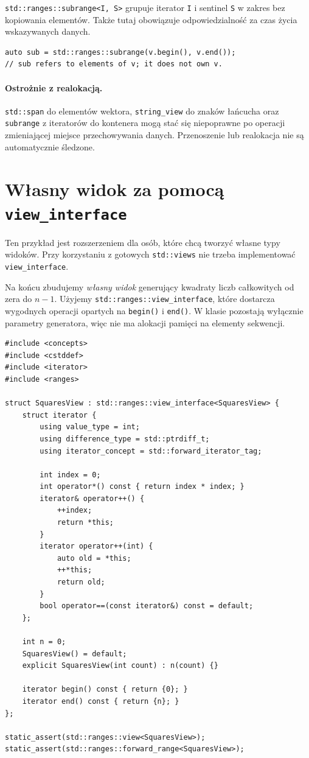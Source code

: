 \texttt{std::ranges::subrange<I, S>} grupuje iterator \texttt{I}
i sentinel \texttt{S} w zakres bez kopiowania elementów. Także tutaj
obowiązuje odpowiedzialność za czas życia wskazywanych danych.

\begin{lstlisting}
auto sub = std::ranges::subrange(v.begin(), v.end());
// sub refers to elements of v; it does not own v.
\end{lstlisting}

\paragraph{Ostrożnie z realokacją.}
\texttt{std::span} do elementów wektora, \texttt{string\_view} do
znaków łańcucha oraz \texttt{subrange} z iteratorów do kontenera mogą
stać się niepoprawne po operacji zmieniającej miejsce przechowywania
danych. Przenoszenie lub realokacja nie są automatycznie śledzone.

\section{Własny widok za pomocą \texttt{view\_interface}}
\label{sec:cpp8-custom-view}

Ten przykład jest rozszerzeniem dla osób, które chcą tworzyć własne
typy widoków. Przy korzystaniu z gotowych \texttt{std::views}
nie trzeba implementować \texttt{view\_interface}.

Na końcu zbudujemy \emph{własny widok} generujący kwadraty liczb
całkowitych od zera do \(n-1\). Użyjemy
\texttt{std::ranges::view\_interface}, które dostarcza wygodnych
operacji opartych na \texttt{begin()} i \texttt{end()}. W klasie
pozostają wyłącznie parametry generatora, więc nie ma alokacji pamięci
na elementy sekwencji.

\begin{lstlisting}
#include <concepts>
#include <cstddef>
#include <iterator>
#include <ranges>

struct SquaresView : std::ranges::view_interface<SquaresView> {
    struct iterator {
        using value_type = int;
        using difference_type = std::ptrdiff_t;
        using iterator_concept = std::forward_iterator_tag;

        int index = 0;
        int operator*() const { return index * index; }
        iterator& operator++() {
            ++index;
            return *this;
        }
        iterator operator++(int) {
            auto old = *this;
            ++*this;
            return old;
        }
        bool operator==(const iterator&) const = default;
    };

    int n = 0;
    SquaresView() = default;
    explicit SquaresView(int count) : n(count) {}

    iterator begin() const { return {0}; }
    iterator end() const { return {n}; }
};

static_assert(std::ranges::view<SquaresView>);
static_assert(std::ranges::forward_range<SquaresView>);
\end{lstlisting}

